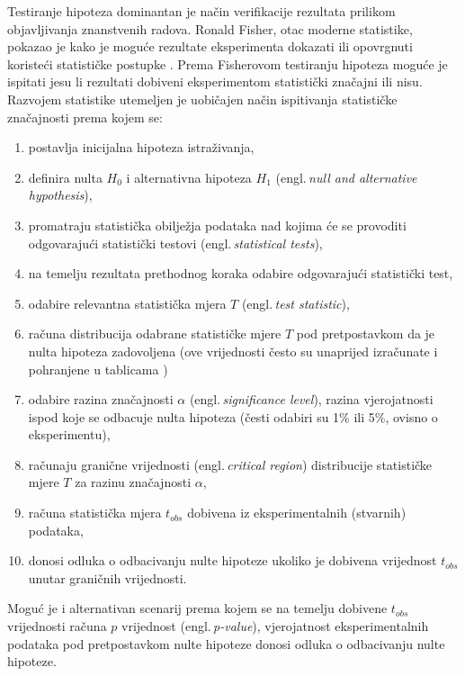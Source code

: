 Testiranje hipoteza dominantan je način verifikacije rezultata prilikom objavljivanja znanstvenih radova. Ronald Fisher, otac moderne statistike, pokazao je kako je moguće rezultate eksperimenta dokazati ili opovrgnuti koristeći statističke postupke \citep{fisher1922mathematical}. Prema Fisherovom testiranju hipoteza moguće je ispitati jesu li rezultati dobiveni eksperimentom statistički značajni ili nisu. Razvojem statistike utemeljen je uobičajen način ispitivanja statističke značajnosti prema kojem se:

\begin{enumerate}
\item postavlja inicijalna hipoteza istraživanja,
\item definira nulta $H_0$ i alternativna hipoteza $H_1$ (engl.\,\textit{null and alternative hypothesis}),
\item promatraju statistička obilježja podataka nad kojima će se provoditi odgovarajući statistički testovi (engl.\,\textit{statistical tests}),
\item na temelju rezultata prethodnog koraka odabire odgovarajući statistički test,
\item odabire relevantna statistička mjera $T$ (engl.\,\textit{test statistic}),
\item računa distribucija odabrane statističke mjere $T$ pod pretpostavkom da je nulta hipoteza zadovoljena (ove vrijednosti često su unaprijed izračunate i pohranjene u tablicama \citep{wilcoxon1973critical})
\item odabire razina značajnosti $\alpha$ (engl.\,\textit{significance level}), razina vjerojatnosti ispod koje se odbacuje nulta hipoteza (česti odabiri su 1\% ili 5\%, ovisno o eksperimentu),
\item računaju granične vrijednosti (engl.\,\textit{critical region}) distribucije statističke mjere $T$ za razinu značajnosti $\alpha$,
\item računa statistička mjera $t_{obs}$ dobivena iz eksperimentalnih (stvarnih) podataka,
\item donosi odluka o odbacivanju nulte hipoteze ukoliko je dobivena vrijednost $t_{obs}$ unutar graničnih vrijednosti.
\end{enumerate}

Moguć je i alternativan scenarij prema kojem se na temelju dobivene $t_{obs}$ vrijednosti računa $p$ vrijednost (engl.\,\textit{p-value}), vjerojatnost eksperimentalnih podataka pod pretpostavkom nulte hipoteze donosi odluka o odbacivanju nulte hipoteze. 

